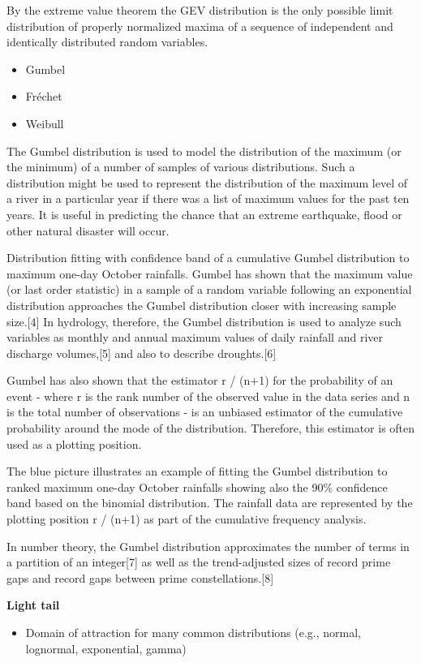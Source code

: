 \documentclass[]{article}
\begin{document}
By the extreme value theorem the GEV distribution is the only possible limit distribution of properly normalized maxima of a sequence of independent and identically distributed random variables. 

\begin{itemize}
\item Gumbel
\item Fréchet
\item Weibull
\end{itemize}
The Gumbel distribution is used to model the distribution of the maximum (or the minimum) of a number of samples of various distributions. Such a distribution might be used to represent the distribution of the maximum level of a river in a particular year if there was a list of maximum values for the past ten years. It is useful in predicting the chance that an extreme earthquake, flood or other natural disaster will occur.
 


Distribution fitting with confidence band of a cumulative Gumbel distribution to maximum one-day October rainfalls.
Gumbel has shown that the maximum value (or last order statistic) in a sample of a random variable following an exponential distribution approaches the Gumbel distribution closer with increasing sample size.[4]
In hydrology, therefore, the Gumbel distribution is used to analyze such variables as monthly and annual maximum values of daily rainfall and river discharge volumes,[5] and also to describe droughts.[6]

Gumbel has also shown that the estimator r / (n+1) for the probability of an event - where r is the rank number of the observed value in the data series and n is the total number of observations - is an unbiased estimator of the cumulative probability around the mode of the distribution. Therefore, this estimator is often used as a plotting position.

The blue picture illustrates an example of fitting the Gumbel distribution to ranked maximum one-day October rainfalls showing also the 90\% confidence band based on the binomial distribution. The rainfall data are represented by the plotting position r / (n+1) as part of the cumulative frequency analysis.

In number theory, the Gumbel distribution approximates the number of terms in a partition of an integer[7] as well as the trend-adjusted sizes of record prime gaps and record gaps between prime constellations.[8]

 
\textbf{Light tail}
\begin{itemize}
\item Domain of attraction for many common distributions
(e.g., normal, lognormal, exponential, gamma)
\end{itemize}
\end{document}

